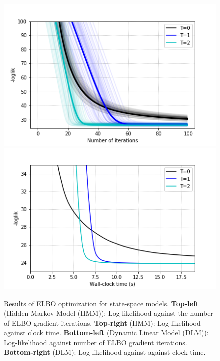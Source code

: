 \begin{figure}[h]
%
  \includegraphics[width=\linewidth]{img/dlm_results.png}
 \endminipage
  \includegraphics[width=\linewidth]{img/dlm_times.png}
\endminipage
\caption{Results of ELBO optimization for state-space models. \textbf{Top-left} (Hidden Markov Model (HMM)): Log-likelihood against the number of ELBO gradient iterations. \textbf{Top-right} (HMM): Log-likelihood against clock time. \textbf{Bottom-left} (Dynamic Linear Model (DLM)): Log-likelihood against number of ELBO gradient iterations. \textbf{Bottom-right} (DLM): Log-likelihood against against clock time.}\label{fig:ss}%
\end{figure}
   

